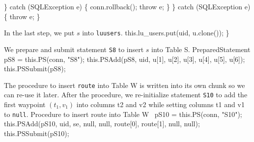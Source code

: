 \documentclass{article}
\def\nwendcode{\endtrivlist \endgroup}      %
\let\nwdocspar=\par
\theoremstyle{definition}                   %
\begin{document}
    \} catch (SQLException e) \{
      conn.rollback();
      throw e;
    \}
  \} catch (SQLException e) \{
    throw e;
  \}
\nwendcode{}\nwdocspar
{\small In the last step, we put $s$ into {\tt{}\protect{}\protect{}lu{}users}.}
\nwenddocs{}\plusendmoddef
  this.lu_users.put(uid, u.clone());
\}
\nwendcode{}\nwdocspar
{\small We prepare and submit statement {\tt{}\protect{}S8} to insert $s$ into Table S.}
\nwenddocs{}\endmoddef{}
PreparedStatement pS8 = this.PS(conn, "S8");
this.PSAdd(pS8, uid, u[1], u[2], u[3], u[4], u[5], u[6]);
this.PSSubmit(pS8);
\nwendcode{}\nwdocspar
{\small The procedure to insert {\tt{}route} into Table W is written into its own
chunk so we can re-use it later.  After the procedure, we re-initialize
statement {\tt{}\protect{}S10} to add the first waypoint $(t_1,v_1)$ into columns
\textsf{t2} and \textsf{v2} while setting columns \textsf{t1} and \textsf{v1}
to {\tt{}null}.}
\nwenddocs{}\endmoddef{}
\LA{}Procedure to insert \code{}route\edoc{} into Table W~{\nwtagstyle{}}\RA{}
pS10 = this.PS(conn, "S10");
this.PSAdd(pS10, uid, se, null, null, route[0], route[1], null, null);
this.PSSubmit(pS10);
\end{document}
